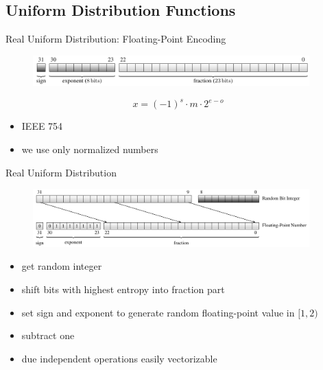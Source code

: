 \documentclass[aspectratio=169]{beamer}
\begin{document}
    \subsection{Uniform Distribution Functions}
    \begin{frame}{Real Uniform Distribution: Floating-Point Encoding}
      \begin{figure}
        \includegraphics[width=0.95\textwidth]{figures/floating-point_encoding_single.pdf}
      \end{figure}
      \begin{mybox}
        \[
          x = (-1)^s \cdot m \cdot 2^{e - o}
        \]
      \end{mybox}
      \begin{itemize}
        \item IEEE 754
        \item we use only normalized numbers
      \end{itemize}
    \end{frame}

    \begin{frame}{Real Uniform Distribution}
      \begin{figure}
        \includegraphics[width=0.95\textwidth]{figures/uniform_implementation_scheme.pdf}
      \end{figure}
      \begin{itemize}
        \item get random integer
        \item shift bits with highest entropy into fraction part
        \item set sign and exponent to generate random floating-point value in $[1,2)$
        \item subtract one
        \item due independent operations easily vectorizable
      \end{itemize}
    \end{frame}
\end{document}
